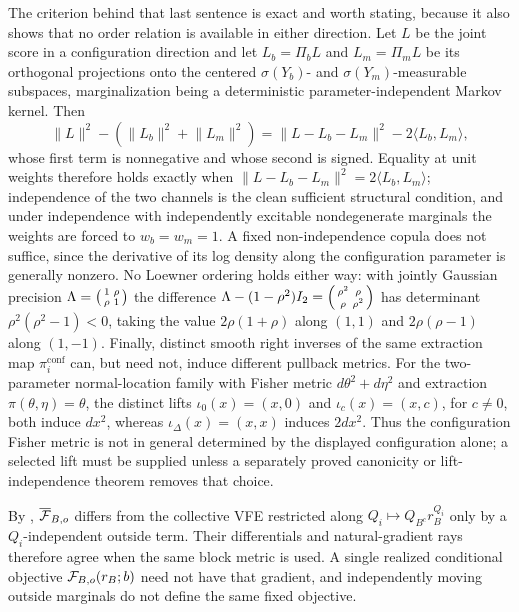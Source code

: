 The criterion behind that last sentence is exact and worth stating, because it
also shows that no order relation is available in either direction.  Let $L$ be
the joint score in a configuration direction and let $L_b=\Pi_bL$ and
$L_m=\Pi_mL$ be its orthogonal projections onto the centered
$\sigma(Y_b)$- and $\sigma(Y_m)$-measurable subspaces, marginalization being a
deterministic parameter-independent Markov kernel.  Then
\begin{equation}
\lVert L\rVert^2
-\left(\lVert L_b\rVert^2+\lVert L_m\rVert^2\right)
=\lVert L-L_b-L_m\rVert^2
-2\langle L_b,L_m\rangle,
\label{eq:hist-joint-versus-product}
\end{equation}
whose first term is nonnegative and whose second is signed.  Equality at unit
weights therefore holds exactly when
$\lVert L-L_b-L_m\rVert^2=2\langle L_b,L_m\rangle$; independence of the two
channels is the clean sufficient structural condition, and under independence
with independently excitable nondegenerate marginals the weights are forced to
$w_b=w_m=1$.  A fixed non-independence copula does not suffice, since the
derivative of its log density along the configuration parameter is generally
nonzero.  No Loewner ordering holds either way: with jointly Gaussian precision
$\Lambda=\begin{psmallmatrix}1&\rho\\\rho&1\end{psmallmatrix}$ the difference
$\Lambda-(1-\rho^2)I_2
=\begin{psmallmatrix}\rho^2&\rho\\\rho&\rho^2\end{psmallmatrix}$ has determinant
$\rho^2(\rho^2-1)<0$, taking the value $2\rho(1+\rho)$ along $(1,1)$ and
$2\rho(\rho-1)$ along $(1,-1)$.  Finally, distinct smooth right inverses of
the same extraction map $\pi_i^{\mathrm{conf}}$ can, but need not, induce
different pullback metrics.  For the two-parameter normal-location family with
Fisher metric $d\theta^2+d\eta^2$ and extraction $\pi(\theta,\eta)=\theta$, the
distinct lifts $\iota_0(x)=(x,0)$ and $\iota_c(x)=(x,c)$, for $c\ne 0$, both
induce $dx^2$, whereas $\iota_\Delta(x)=(x,x)$ induces $2dx^2$.  Thus the
configuration Fisher metric is not in general determined by the displayed
configuration alone; a selected lift must be supplied unless a separately
proved canonicity or lift-independence theorem removes that choice.

By ,
\(\overline{\mathcal F}_{B,o}\) differs from the collective VFE restricted along
\(Q_i\mapsto Q_{B^c}r_B^{Q_i}\) only by a \(Q_i\)-independent outside term.
Their differentials and natural-gradient rays therefore agree when the same
block metric is used.  A single realized conditional objective
\(\mathcal F_{B,o}(r_B;b)\) need not have that gradient, and independently moving
outside marginals do not define the same fixed objective. 

